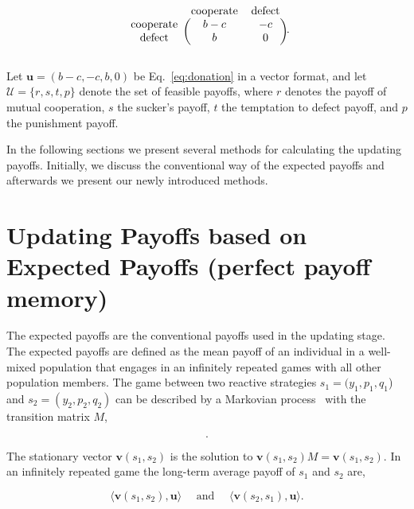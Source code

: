 \documentclass[11pt]{article}
\theoremstyle{plainCl1}
\theoremstyle{plainCl2}
\begin{document}
\begin{equation}\label{eq:donation}
    \begin{blockarray}{ccc}
        & \text{cooperate} & \text{defect} \\
        \begin{block}{c(cc)}
            \text{cooperate} & b - c & -c \\
            \text{defect} & b & 0 \\
        \end{block}
    \end{blockarray}.
\end{equation}

Let \(\mathbf{u} = (b-c, -c, b, 0)\) be Eq.~\ref{eq:donation} in a vector format, and let \(\mathcal{U}
= \{r, s, t, p\}\) denote the set of feasible payoffs, where \(r\) denotes the
payoff of mutual cooperation, \(s\) the sucker's payoff, \(t\) the temptation to
defect payoff, and \(p\) the punishment payoff.

In the following sections we present several methods for calculating the
updating payoffs. Initially, we discuss the conventional way of the
expected payoffs and afterwards we present our newly introduced methods.

\section{Updating Payoffs based on Expected Payoffs (perfect payoff memory)}\label{section:perfect_memory}

The expected payoffs are the conventional payoffs used in the updating stage.
The expected payoffs are defined as the mean payoff of an individual in a well-mixed population that
engages in an infinitely repeated games with all other population members.
The game between two reactive strategies $s_1\!=\!(y_1, p_1, q_1$) and $s_2\!=\!(y_2,p_2,q_2)$
can be described by a Markovian process~\cite{nowak:APC:1989} with the
transition matrix \(M\),

\begin{equation}\label{eq:transition_matrix}
  .
\end{equation}

The stationary vector \(\mathbf{v}(s_1,s_2)\) is the solution to
\(\mathbf{v}(s_1,s_2) M = \mathbf{v}(s_1,s_2)\). In an infinitely repeated game
the long-term average payoff of \(s_1\) and \(s_2\) are,

\[\langle\mathbf{v}(s_1,s_2),\mathbf{u}\rangle \quad  \text{ and } \quad  \langle\mathbf{v}(s_2,s_1), \mathbf{u}\rangle.\]
\end{document}
